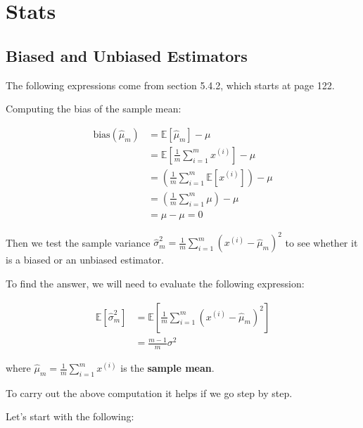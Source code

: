 \chapter{Stats} \label{chapter:tensors}

\section{Biased and Unbiased Estimators}

The following expressions come from \cite{Goodfellow-et-al-2016} section 5.4.2, 
which starts at page 122.

Computing the bias of the sample mean:

\begin{align*}
\text{bias}(\hat{\mu}_m) &= \mathbb{E}\left[\hat{\mu}_m\right] - \mu \\
&= \mathbb{E} \left[ \frac{1}{m} \sum_{i=1}^{m} x^{(i)} \right] - \mu \\
&= \left( \frac{1}{m} \sum_{i=1}^{m} \mathbb{E}\left[ x^{(i)} \right] \right) - \mu\\
&= \left( \frac{1}{m} \sum_{i=1}^{m} \mu \right) - \mu \\
&= \mu - \mu = 0
\end{align*}

Then we test the sample variance
$\hat{\sigma}^{2}_{m} = \frac{1}{m} \sum_{i=1}^{m} \left( x^{(i)} - \hat{\mu}_m \right)^2$
to see whether it is a biased or an unbiased estimator.

To find the answer, we will need to evaluate the following expression:

\begin{align} \label{stats:biased-variance-estimator}
\mathbb{E}\left[ \hat{\sigma}^{2}_{m} \right] 
    &= \mathbb{E} \left[ \frac{1}{m} \sum_{i=1}^{m} \left( x^{(i)} - \hat{\mu}_m \right)^2 \right] \\
&= \frac{m-1}{m} \sigma^2
\end{align}

where $\hat{\mu}_m = \frac{1}{m} \sum_{i=1}^{m} x^{(i)}$ is the \textbf{sample mean}.
 


To carry out the above computation it helps if we go step by step.

Let's start with the following:


